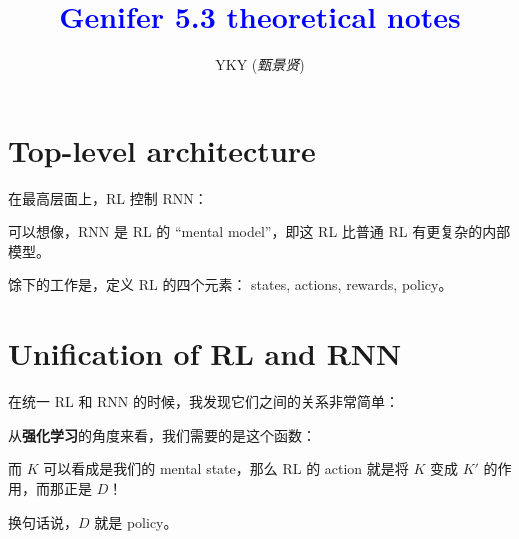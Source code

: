\documentclass[12pt]{article}
\title{\textcolor{blue}{Genifer 5.3 theoretical notes}}
\author{YKY (\textit{甄景贤})}
\newcommand{\tab}{\hspace*{1cm}}
\begin{document}


{\let\newpage\relax\maketitle}

\maketitle
\setlength{\parindent}{0em}
\setlength{\parskip}{1.5ex plus0.5ex minus1.2ex}

\section{Top-level architecture}

在最高层面上，RL 控制 RNN：

\begin{center}
\end{center}

可以想像，RNN 是 RL 的 ``mental model''，即这 RL 比普通 RL 有更复杂的内部模型。

馀下的工作是，定义 RL 的四个元素： states, actions, rewards, policy。

\section{Unification of RL and RNN}

在统一 RL 和 RNN 的时候，我发现它们之间的关系非常简单：

从\textbf{强化学习}的角度来看，我们需要的是这个函数：
\begin{center}
\end{center}
而 $K$ 可以看成是我们的 mental state，那么 RL 的 action 就是将 $K$ 变成 $K'$ 的作用，而那正是 $D$！
\begin{center}
\end{center}
换句话说，$D$ 就是 policy。
\end{document}
